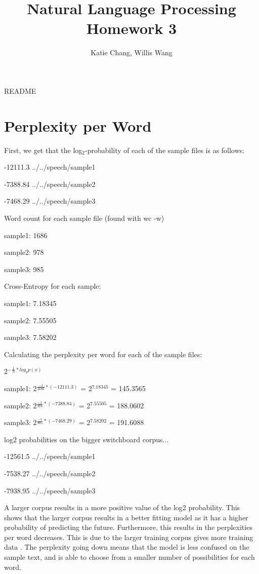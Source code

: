 \documentclass[12pt, letterpaper]{article}
\title{Natural Language Processing Homework 3}
\author{Katie Chang, Willis Wang}
\begin{document}
\maketitle

README

\section{Perplexity per Word}
First, we get that the log$_{2}$-probability of each of the sample files is as follows:

-12111.3	../../speech/sample1

-7388.84	../../speech/sample2

-7468.29	../../speech/sample3

Word count for each sample file (found with wc -w)

sample1: 1686

sample2: 978
     
sample3: 985

Cross-Entropy for each sample:

sample1: 7.18345

sample2: 7.55505

sample3: 7.58202

Calculating the perplexity per word for each of the sample files:

2$^{-\frac{1}{N}*log_{2}p(x)}$

sample1: 2$^{\frac{-1}{1686} * (-12111.3)}$ = 2$^{7.18345}$ = 145.3565

sample2: 2$^{\frac{-1}{978} * (-7388.84)}$ = 2$^{7.55505}$ = 188.0602

sample3: 2$^{\frac{-1}{985} * (-7468.29)}$ = 2$^{7.58202}$ = 191.6088

log2 probabilities on the bigger switchboard corpus...

-12561.5	../../speech/sample1

-7538.27	../../speech/sample2

-7938.95	../../speech/sample3

A larger corpus results in a more positive value of the log2 probability. This shows that the larger corpus results in a better fitting model as it has a higher probability of predicting the future. Furthermore, this results in the perplexities per word decreases. This is due to the larger training corpus gives more training data . The perplexity going down means that the model is less confused on the sample text, and is able to choose from a smaller number of possibilities for each word.
\end{document}
